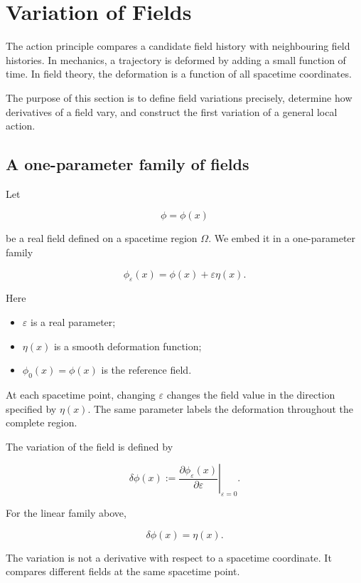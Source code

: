 \section{Variation of Fields}
\label{sec:variation_of_fields}

The action principle compares a candidate field history with neighbouring field histories. In mechanics, a trajectory is deformed by adding a small function of time. In field theory, the deformation is a function of all spacetime coordinates.

The purpose of this section is to define field variations precisely, determine how derivatives of a field vary, and construct the first variation of a general local action.

\subsection{A one-parameter family of fields}

Let

\[
\phi=\phi(x)
\]

be a real field defined on a spacetime region \(\Omega\). We embed it in a one-parameter family

\[
\boxed{
\phi_{\varepsilon}(x)
=
\phi(x)+\varepsilon\eta(x)
}.
\]

Here

\begin{itemize}
    \item \(\varepsilon\) is a real parameter;
    \item \(\eta(x)\) is a smooth deformation function;
    \item \(\phi_{0}(x)=\phi(x)\) is the reference field.
\end{itemize}

At each spacetime point, changing \(\varepsilon\) changes the field value in the direction specified by \(\eta(x)\). The same parameter labels the deformation throughout the complete region.

The variation of the field is defined by

\[
\delta\phi(x)
:=
\left.
\frac{\partial\phi_{\varepsilon}(x)}{\partial\varepsilon}
\right|_{\varepsilon=0}.
\]

For the linear family above,

\[
\boxed{
\delta\phi(x)=\eta(x)
}.
\]

The variation is not a derivative with respect to a spacetime coordinate. It compares different fields at the same spacetime point.

